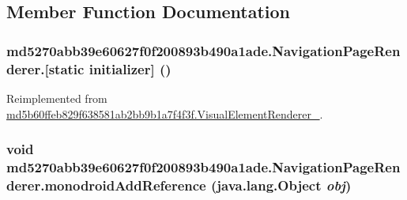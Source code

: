 \subsection{Member Function Documentation}
\hypertarget{classmd5270abb39e60627f0f200893b490a1ade_1_1_navigation_page_renderer_68a92bc28bda6e25ebce11def38835b7}{
\subsubsection[{[static initializer]}]{\setlength{\rightskip}{0pt plus 5cm}md5270abb39e60627f0f200893b490a1ade.NavigationPageRenderer.\mbox{[}static initializer\mbox{]} ()}}
\label{classmd5270abb39e60627f0f200893b490a1ade_1_1_navigation_page_renderer_68a92bc28bda6e25ebce11def38835b7}




Reimplemented from \hyperlink{classmd5b60ffeb829f638581ab2bb9b1a7f4f3f_1_1_visual_element_renderer__1_3ae26bd8575212fb6d6f14487b4f48d4}{md5b60ffeb829f638581ab2bb9b1a7f4f3f.VisualElementRenderer\_}.\hypertarget{classmd5270abb39e60627f0f200893b490a1ade_1_1_navigation_page_renderer_876162ea80dae791f8a70b5bc12ee81c}{
\subsubsection[{monodroidAddReference}]{\setlength{\rightskip}{0pt plus 5cm}void md5270abb39e60627f0f200893b490a1ade.NavigationPageRenderer.monodroidAddReference (java.lang.Object {\em obj})}}
\label{classmd5270abb39e60627f0f200893b490a1ade_1_1_navigation_page_renderer_876162ea80dae791f8a70b5bc12ee81c}




